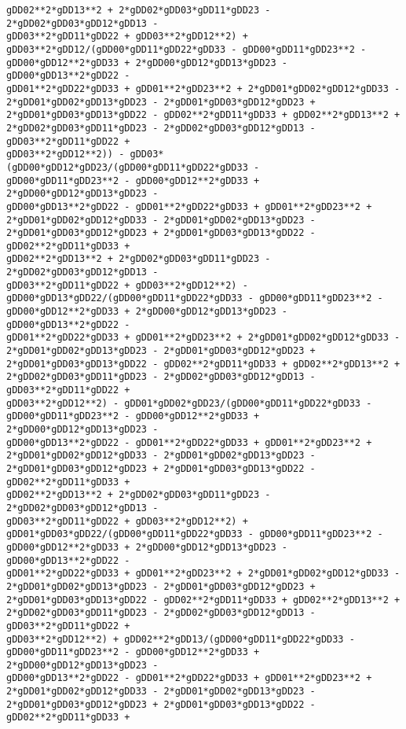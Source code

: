 \documentclass[landscape,letterpaper,10pt,english]{article}
\begin{document}
\begin{Verbatim}[commandchars=\\\{\}]
gDD02**2*gDD13**2 + 2*gDD02*gDD03*gDD11*gDD23 - 2*gDD02*gDD03*gDD12*gDD13 -
gDD03**2*gDD11*gDD22 + gDD03**2*gDD12**2) +
gDD03**2*gDD12/(gDD00*gDD11*gDD22*gDD33 - gDD00*gDD11*gDD23**2 -
gDD00*gDD12**2*gDD33 + 2*gDD00*gDD12*gDD13*gDD23 - gDD00*gDD13**2*gDD22 -
gDD01**2*gDD22*gDD33 + gDD01**2*gDD23**2 + 2*gDD01*gDD02*gDD12*gDD33 -
2*gDD01*gDD02*gDD13*gDD23 - 2*gDD01*gDD03*gDD12*gDD23 +
2*gDD01*gDD03*gDD13*gDD22 - gDD02**2*gDD11*gDD33 + gDD02**2*gDD13**2 +
2*gDD02*gDD03*gDD11*gDD23 - 2*gDD02*gDD03*gDD12*gDD13 - gDD03**2*gDD11*gDD22 +
gDD03**2*gDD12**2)) - gDD03*(gDD00*gDD12*gDD23/(gDD00*gDD11*gDD22*gDD33 -
gDD00*gDD11*gDD23**2 - gDD00*gDD12**2*gDD33 + 2*gDD00*gDD12*gDD13*gDD23 -
gDD00*gDD13**2*gDD22 - gDD01**2*gDD22*gDD33 + gDD01**2*gDD23**2 +
2*gDD01*gDD02*gDD12*gDD33 - 2*gDD01*gDD02*gDD13*gDD23 -
2*gDD01*gDD03*gDD12*gDD23 + 2*gDD01*gDD03*gDD13*gDD22 - gDD02**2*gDD11*gDD33 +
gDD02**2*gDD13**2 + 2*gDD02*gDD03*gDD11*gDD23 - 2*gDD02*gDD03*gDD12*gDD13 -
gDD03**2*gDD11*gDD22 + gDD03**2*gDD12**2) -
gDD00*gDD13*gDD22/(gDD00*gDD11*gDD22*gDD33 - gDD00*gDD11*gDD23**2 -
gDD00*gDD12**2*gDD33 + 2*gDD00*gDD12*gDD13*gDD23 - gDD00*gDD13**2*gDD22 -
gDD01**2*gDD22*gDD33 + gDD01**2*gDD23**2 + 2*gDD01*gDD02*gDD12*gDD33 -
2*gDD01*gDD02*gDD13*gDD23 - 2*gDD01*gDD03*gDD12*gDD23 +
2*gDD01*gDD03*gDD13*gDD22 - gDD02**2*gDD11*gDD33 + gDD02**2*gDD13**2 +
2*gDD02*gDD03*gDD11*gDD23 - 2*gDD02*gDD03*gDD12*gDD13 - gDD03**2*gDD11*gDD22 +
gDD03**2*gDD12**2) - gDD01*gDD02*gDD23/(gDD00*gDD11*gDD22*gDD33 -
gDD00*gDD11*gDD23**2 - gDD00*gDD12**2*gDD33 + 2*gDD00*gDD12*gDD13*gDD23 -
gDD00*gDD13**2*gDD22 - gDD01**2*gDD22*gDD33 + gDD01**2*gDD23**2 +
2*gDD01*gDD02*gDD12*gDD33 - 2*gDD01*gDD02*gDD13*gDD23 -
2*gDD01*gDD03*gDD12*gDD23 + 2*gDD01*gDD03*gDD13*gDD22 - gDD02**2*gDD11*gDD33 +
gDD02**2*gDD13**2 + 2*gDD02*gDD03*gDD11*gDD23 - 2*gDD02*gDD03*gDD12*gDD13 -
gDD03**2*gDD11*gDD22 + gDD03**2*gDD12**2) +
gDD01*gDD03*gDD22/(gDD00*gDD11*gDD22*gDD33 - gDD00*gDD11*gDD23**2 -
gDD00*gDD12**2*gDD33 + 2*gDD00*gDD12*gDD13*gDD23 - gDD00*gDD13**2*gDD22 -
gDD01**2*gDD22*gDD33 + gDD01**2*gDD23**2 + 2*gDD01*gDD02*gDD12*gDD33 -
2*gDD01*gDD02*gDD13*gDD23 - 2*gDD01*gDD03*gDD12*gDD23 +
2*gDD01*gDD03*gDD13*gDD22 - gDD02**2*gDD11*gDD33 + gDD02**2*gDD13**2 +
2*gDD02*gDD03*gDD11*gDD23 - 2*gDD02*gDD03*gDD12*gDD13 - gDD03**2*gDD11*gDD22 +
gDD03**2*gDD12**2) + gDD02**2*gDD13/(gDD00*gDD11*gDD22*gDD33 -
gDD00*gDD11*gDD23**2 - gDD00*gDD12**2*gDD33 + 2*gDD00*gDD12*gDD13*gDD23 -
gDD00*gDD13**2*gDD22 - gDD01**2*gDD22*gDD33 + gDD01**2*gDD23**2 +
2*gDD01*gDD02*gDD12*gDD33 - 2*gDD01*gDD02*gDD13*gDD23 -
2*gDD01*gDD03*gDD12*gDD23 + 2*gDD01*gDD03*gDD13*gDD22 - gDD02**2*gDD11*gDD33 +

\end{Verbatim}
\end{document}
